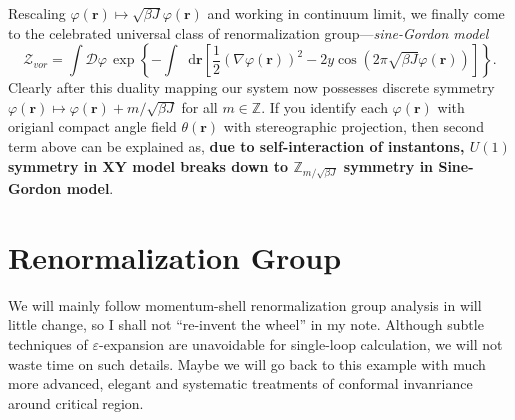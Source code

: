 \documentclass[10pt,nofootinbib]{revtex4}
\newcommand*\dd{\mathop{}\!\mathrm{d}}
\def\Z{\mathcal{Z}}
\begin{document}
		 Rescaling $\varphi(\bm{r})\mapsto\sqrt{\beta J}\varphi(\bm{r})$ and working in continuum limit, we finally come to the celebrated universal class of renormalization group---\emph{sine-Gordon model}
		\begin{equation}\label{2.2.3}
			\Z_{vor}=\int\mathcal{D}\varphi\,\exp \left\{-\int\dd\bm{r} \left[\dfrac{1}{2}(\nabla\varphi(\bm{r}))^2-2y\cos\left(2\pi\sqrt{\beta J}\varphi(\bm{r})\right)\right]\right\}.
		\end{equation}
		Clearly after this duality mapping our system now possesses discrete symmetry $\varphi(\bm{r})\mapsto \varphi(\bm{r})+m/\sqrt{\beta J}$ for all $m\in\mathbb{Z}$. If you identify each $\varphi(\bm{r})$ with origianl compact angle field $\theta(\bm{r})$ with stereographic projection, then second term above can be explained as, \textbf{\color{red} due to self-interaction of instantons, $U(1)$ symmetry in XY model breaks down to $\mathbb{Z}_{m/\sqrt{\beta J}}$ symmetry in Sine-Gordon model}.


\section{Renormalization Group}
	We will mainly follow momentum-shell renormalization group analysis in  \cite{kogut1979introduction,nagaosa2013quantum} will little change, so I shall not ``re-invent the wheel'' in my note. Although subtle techniques of $\varepsilon$-expansion \cite{wilson1974renormalization} are unavoidable for single-loop calculation, we will not waste time on such details. Maybe we will go back to this example with much more advanced, elegant and systematic treatments of conformal invanriance around critical region.
\end{document}
